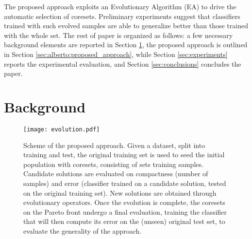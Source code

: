 \documentclass{article}
\begin{document}
The proposed approach exploits an Evolutionary Algorithm (EA) to drive the automatic selection of coresets. Preliminary experiments suggest that classifiers trained with such evolved samples are able to generalize better than those trained with the whole set. The rest of paper is organized as follows: a few necessary background elements are reported in Section \ref{sec:background}, the proposed approach is outlined in Section \ref{sec:alberto:proposed_approach}, while Section \ref{sec:experiments} reports the experimental evaluation, and Section \ref{sec:conclusions} concludes the paper.

\section{Background}
\label{sec:background}


\begin{figure*}[!htb]
    \centering
    \texttt{[image: evolution.pdf]}
    \caption{Scheme of the proposed approach. Given a dataset, split into training and test, the original training set is used to seed the initial population with coresets, consisting of sets training samples. Candidate solutions are evaluated on compactness (number of samples) and error (classifier trained on a candidate solution, tested on the original training set). New solutions are obtained through evolutionary operators. Once the evolution is complete, the coresets on the Pareto front undergo a final evaluation, training the classifier that will then compute its error on the (unseen) original test set, to evaluate the generality of the approach.}
    \label{figure:algorithm}
\end{figure*}
\end{document}
